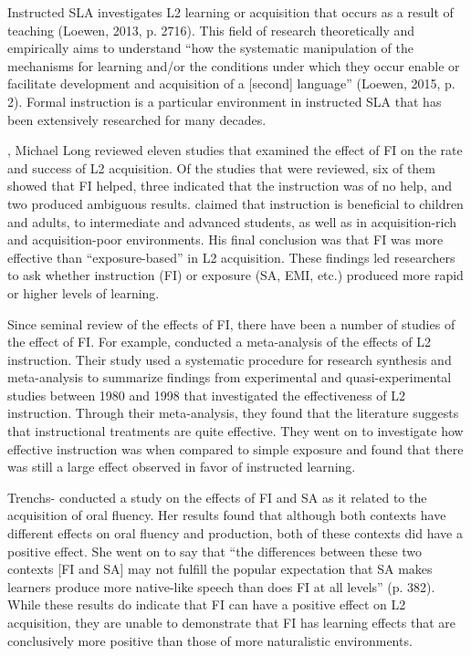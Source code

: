 Instructed SLA investigates L2 learning or acquisition that occurs as a result of teaching (Loewen, 2013, p. 2716). This field of research theoretically and empirically aims to understand “how the systematic manipulation of the mechanisms for learning and/or the conditions under which they occur enable or facilitate development and acquisition of a [second] language” (Loewen, 2015, p. 2). Formal instruction is a particular environment in instructed SLA that has been extensively researched for many decades. 

\citealt{In1988}, Michael Long reviewed eleven studies that examined the effect of FI on the rate and success of L2 acquisition. Of the studies that were reviewed, six of them showed that FI helped, three indicated that the instruction was of no help, and two produced ambiguous results. \citet{Long1983} claimed that instruction is beneficial to children and adults, to intermediate and advanced students, as well as in acquisition-rich and acquisition-poor environments. His final conclusion was that FI was more effective than “exposure-based” in L2 acquisition. These findings led researchers to ask whether instruction (FI) or exposure (SA, EMI, etc.) produced more rapid or higher levels of learning. 

Since  seminal review of the effects of FI, there have been a number of studies of the effect of FI. For example, \citet{NorrisOrtega2001} conducted a meta-analysis of the effects of L2 instruction. Their study used a systematic procedure for research synthesis and meta-analysis to summarize findings from experimental and quasi-experimental studies between 1980 and 1998 that investigated the effectiveness of L2 instruction. Through their meta-analysis, they found that the literature suggests that instructional treatments are quite effective. They went on to investigate how effective instruction was when compared to simple exposure and found that there was still a large effect observed in favor of instructed learning.

Trenchs-\citet{Parera2009} conducted a study on the effects of FI and SA as it related to the acquisition of oral fluency. Her results found that although both contexts have different effects on oral fluency and production, both of these contexts did have a positive effect. She went on to say that “the differences between these two contexts [FI and SA] may not fulfill the popular expectation that SA makes learners produce more native-like speech than does FI at all levels” (p. 382). While these results do indicate that FI can have a positive effect on L2 acquisition, they are unable to demonstrate that FI has learning effects that are conclusively more positive than those of more naturalistic environments.

